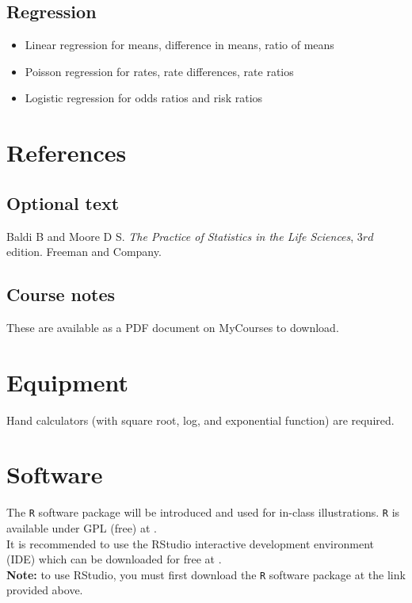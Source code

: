 \documentclass[]{article}
\begin{document}
\subsection{Regression}
\begin{itemize}
\item Linear regression for means, difference in means, ratio of means
\item Poisson regression for rates, rate differences, rate ratios
\item Logistic regression for odds ratios and risk ratios
\end{itemize}




\section{References}
\subsection{Optional text}
Baldi B and Moore D S. \textit{The Practice of Statistics in the Life Sciences}, 3${rd}$ edition. Freeman and Company.\\

\subsection{Course notes}
These are available as a PDF document on MyCourses to download.


\section{Equipment}
Hand calculators (with square root, log, and exponential function) are required.  


\section{Software}
The \texttt{R} software package will be introduced and used for in-class illustrations. \texttt{R} is available under GPL (free) at \href{http://cran.r-project.org/}{\color{blue}{http://cran.r-project.org/}}. \\

\noindent
It is recommended to use the RStudio interactive development environment (IDE) which can be downloaded for free at \href{http://www.rstudio.com/}{\color{blue}{http://www.rstudio.com/}}.\\ 
\textbf{Note:} to use RStudio, you must first download the  \texttt{R}
software package at the link provided above.\\
\end{document}
